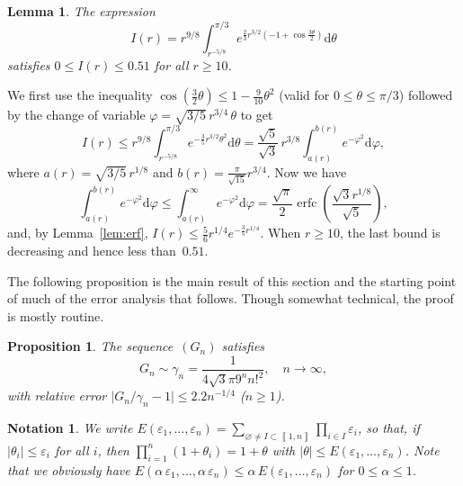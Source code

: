 \documentclass[10pt, conference]{IEEEtran}
\newcommand{\abs}[1]{\mathopen|#1\mathclose|}
\newtheorem{lemma}{Lemma}
\newtheorem{notation}{Notation}
\newtheorem{proposition}{Proposition}
\newcommand{\mathd}{\mathrm{d}}
\begin{document}
\begin{lemma} \label{lem:int} \mightbeomitted
  \label{lem:I2-I1}The expression
  \[ I(r) = r^{9 / 8}  \int_{r^{- 5 / 8}}^{\pi / 3}
     e^{\frac{2}{3} r^{3 / 2} (- 1 + \cos \frac{3 \theta}{2})}
     \mathd \theta \]
  satisfies $0 \leq I(r) \leq 0.51$ for all $r
  \geq 10$.
\end{lemma}

\begin{IEEEproof}
  We first use the inequality $\cos (\frac{3}{2} \theta) \leq 1 -
  \frac{9}{10} \theta^2$ (valid for $0 \leq \theta \leq \pi / 3$)
  followed by the change of variable $\varphi = \sqrt{3/5}\,r^{3 / 4}\,\theta$ to get
  \[ I(r) \leq r^{9 / 8}  \int_{r^{- 5 / 8}}^{\pi / 3} e^{-
     \frac{3}{5} r^{3 / 2} \theta^2} \mathd \theta = \frac{\sqrt{5}}{\sqrt{3}}\, r^{3 / 8} 
     \int_{a(r)}^{b(r)} e^{-
     \varphi^2} \mathd \varphi, \]
  where $a(r) = \sqrt{3/5}\,r^{1 / 8}$ and $b(r) =
  \frac{\pi}{ \sqrt{15}} r^{3 / 4}$. Now we have
  \[ \int_{a(r)}^{b(r)} e^{-
     \varphi^2} \mathd \varphi \leq \int_{a(r
    )}^{\infty} e^{-\varphi^2} \mathd \varphi = \frac{\sqrt{\pi}}{2}
      \operatorname{erfc}\left(\frac{\sqrt{3}
     r^{1 / 8}}{\sqrt{5}}\right), \]
  and, by Lemma~\ref{lem:erf},
  $ I(r) \leq \frac{5}{6} r^{1 / 4} e^{- \frac{3}{5} r^{ 1 / 4}}$.
  When $r \geq 10$, the last bound is decreasing and hence less than~$0.51$.
\end{IEEEproof}

The following proposition is the main result of this section and the starting point of much of the error analysis that follows.
Though somewhat technical, the proof is mostly routine.

\begin{proposition}
  \label{prop:bound on Gn}The sequence~$(G_n)$ satisfies
  \[ G_n \sim \gamma_n = \frac{1}{4 \sqrt{3} \pi 9^n n!^2}, \hspace{1em} n
     \rightarrow \infty, \]
  with relative error
  $ \abs{G_n / \gamma_n - 1} \leq 2.2 n^{- 1 / 4} $ \hspace{1em}($n \geq 1$).
\end{proposition}

\begin{notation} \label{not:E}
  We write
  $ E(\varepsilon_1, \ldots, \varepsilon_n) = \sum_{\varnothing
     \neq I \subset \left\llbracket 1, n \right\rrbracket} \prod_{i \in I}
     \varepsilon_i$,
  so that, if $\abs{\theta_i} \leq \varepsilon_i$ for all $i$, then $\prod_{i=1}^n (1+\theta_i) = 1+\theta$ with $\abs{\theta} \leq E(\varepsilon_1, \ldots,
  \varepsilon_n)$.
  Note that we obviously have $E(\alpha\,\varepsilon_1, \ldots, \alpha\,\varepsilon_n) \le \alpha\,E(\varepsilon_1, \ldots, \varepsilon_n)$ for $0 \le \alpha \le 1$.
\end{notation}
\end{document}
